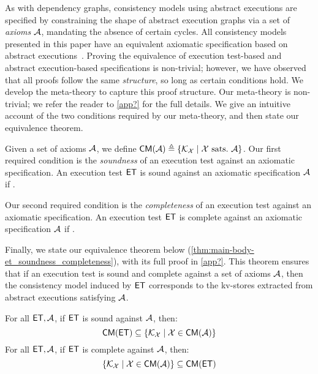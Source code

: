 As with dependency graphs, consistency models using abstract executions are specified by constraining the shape of abstract execution graphs via a set of \emph{axioms} $\mathcal{A}$, \eg mandating the absence of certain cycles.
All consistency models presented in this paper have an equivalent axiomatic specification based on abstract executions~\cite{framework-concur,laws}. 
Proving the equivalence of execution test-based and abstract execution-based specifications is non-trivial; 
however, we have observed that all proofs follow the same \emph{structure}, so long as certain conditions hold. 
We develop the meta-theory to capture this proof structure.
Our meta-theory is non-trivial; we refer the reader to \cref{app?} for the full details. 
We give an intuitive account of the two conditions required by our meta-theory, and then state our equivalence theorem. 

Given a set of axioms $\mathcal{A}$, we define $\mathsf{CM}(\mathcal{A}) \triangleq \{\mathcal{K}_{\mathcal{X}} \mid \mathcal{X} \text{ sats.\ } \mathcal{A} \}$.
Our first required condition is the  \emph{soundness} of an execution test against an axiomatic specification.
An execution test $\mathsf{ET}$ is sound against an axiomatic specification $\mathcal{A}$ if \todo.



Our second required condition is the  \emph{completeness} of an execution test against an axiomatic specification.
An execution test $\mathsf{ET}$ is complete against an axiomatic specification $\mathcal{A}$ if \todo.


Finally, we state our equivalence theorem below (\cref{thm:main-body-et_soundness_completeness}), with its full proof in \cref{app?}. 
This theorem ensures that if an execution test is sound and complete against a set of axioms $\mathcal{A}$, 
then the consistency model induced by $\mathsf{ET}$ corresponds to the kv-stores extracted from abstract executions satisfying $\mathcal{A}$.

\begin{theorem}
\label{thm:main-body-et_soundness_completeness}
For all $\mathsf{ET}, \mathcal{A}$, if $\mathsf{ET}$ is sound against $\mathcal{A}$, then:
\[
    \mathsf{CM}(\mathsf{ET}) \subseteq \{ \mathcal{K}_{\mathcal{X}} \mid \mathcal{X} \in \mathsf{CM}(\mathcal{A})\}
\]
For all $\mathsf{ET}, \mathcal{A}$, if $\mathsf{ET}$ is complete against $\mathcal{A}$, then:
\[
    \{ \mathcal{K}_{\mathcal{X}} \mid \mathcal{X} \in \mathsf{CM}(\mathcal{A})\}  \subseteq \mathsf{CM}(\mathsf{ET})
\]
\end{theorem} 


